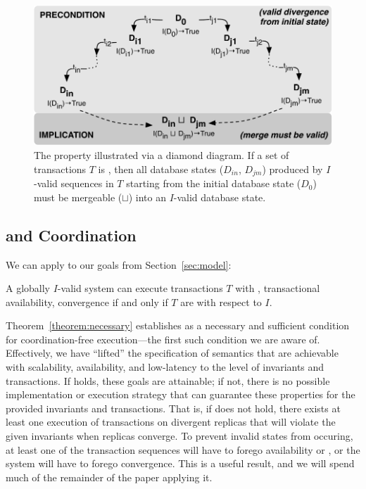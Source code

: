 \begin{figure}
\begin{center}
\includegraphics[width=\columnwidth]{figs/icommute.pdf}\vspace{-1em}
\end{center}
\caption{The \iconfluence property illustrated via a diamond
  diagram. If a set of transactions $T$ is \iconfluent, then all
  database states ($D_{in}$, $D_{jm}$) produced by $I$-valid sequences
  in $T$ starting from the initial database state ($D_0$) must be
  mergeable ($\sqcup$) into an $I$-valid database state.}
\label{fig:iconfluence}
\end{figure}

\subsection{\iconfluence and Coordination}

We can apply \iconfluence to our goals from Section~\ref{sec:model}:

\begin{theorem}
\label{theorem:necessary}
A globally $I$-valid system can execute transactions $T$ with
\cfreedom, transactional availability, convergence if and only if $T$
are \iconfluent with respect to $I$.
\end{theorem}

Theorem~\ref{theorem:necessary} establishes \iconfluence as a
necessary and sufficient condition for coordination-free
execution---the first such condition we are aware of. Effectively, we
have ``lifted'' the specification of semantics that are achievable
with scalability, availability, and low-latency to the level of
invariants and transactions. If \iconfluence holds, these goals are
attainable; if not, there is no possible implementation or execution
strategy that can guarantee these properties for the provided
invariants and transactions. That is, if \iconfluence does not hold,
there exists at least one execution of transactions on divergent
replicas that will violate the given invariants when replicas
converge. To prevent invalid states from occuring, at least one of the
transaction sequences will have to forego availability or \cfreedom,
or the system will have to forego convergence. This is a useful
result, and we will spend much of the remainder of the paper applying
it.

